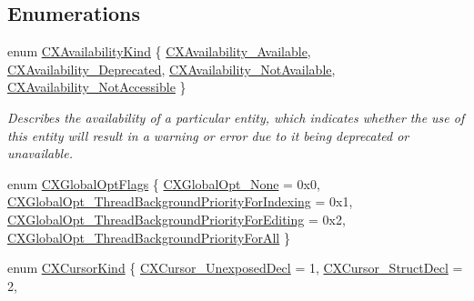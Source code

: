 \subsection*{Enumerations}
\begin{DoxyCompactItemize}
\item 
enum \mbox{\hyperlink{group__CINDEX_gada331ea0195e952c8f181ecf15e83d71}{C\+X\+Availability\+Kind}} \{ \mbox{\hyperlink{group__CINDEX_ggada331ea0195e952c8f181ecf15e83d71a6e2a9a033b06aa1ac8ab0b8ad49f8467}{C\+X\+Availability\+\_\+\+Available}}, 
\mbox{\hyperlink{group__CINDEX_ggada331ea0195e952c8f181ecf15e83d71a8295a994c76ec17e391050da7334e8fc}{C\+X\+Availability\+\_\+\+Deprecated}}, 
\mbox{\hyperlink{group__CINDEX_ggada331ea0195e952c8f181ecf15e83d71af70fbd074c138cdf81b0286d202b0fa6}{C\+X\+Availability\+\_\+\+Not\+Available}}, 
\mbox{\hyperlink{group__CINDEX_ggada331ea0195e952c8f181ecf15e83d71af6542f250a1d21e256cd543669a49435}{C\+X\+Availability\+\_\+\+Not\+Accessible}}
 \}
\begin{DoxyCompactList}\small\item\em Describes the availability of a particular entity, which indicates whether the use of this entity will result in a warning or error due to it being deprecated or unavailable. \end{DoxyCompactList}\item 
enum \mbox{\hyperlink{group__CINDEX_ga1b451634928d6bcc961bf72a40e4d035}{C\+X\+Global\+Opt\+Flags}} \{ \mbox{\hyperlink{group__CINDEX_gga1b451634928d6bcc961bf72a40e4d035a869efb651da9e6d3da10a0fb43941d0d}{C\+X\+Global\+Opt\+\_\+\+None}} = 0x0, 
\mbox{\hyperlink{group__CINDEX_gga1b451634928d6bcc961bf72a40e4d035aba7b16ae973f035cd4156eeae579e47a}{C\+X\+Global\+Opt\+\_\+\+Thread\+Background\+Priority\+For\+Indexing}} = 0x1, 
\mbox{\hyperlink{group__CINDEX_gga1b451634928d6bcc961bf72a40e4d035a0da291ff18cccf9fcce2e75d46337a63}{C\+X\+Global\+Opt\+\_\+\+Thread\+Background\+Priority\+For\+Editing}} = 0x2, 
\mbox{\hyperlink{group__CINDEX_gga1b451634928d6bcc961bf72a40e4d035ad38031ffee9be191b92869bdf0fe82e2}{C\+X\+Global\+Opt\+\_\+\+Thread\+Background\+Priority\+For\+All}}
 \}
\item 
enum \mbox{\hyperlink{group__CINDEX_gaaccc432245b4cd9f2d470913f9ef0013}{C\+X\+Cursor\+Kind}} \{ \newline
\mbox{\hyperlink{group__CINDEX_ggaaccc432245b4cd9f2d470913f9ef0013ab6c248d25235d6188a1c56ecba85efaf}{C\+X\+Cursor\+\_\+\+Unexposed\+Decl}} = 1, 
\mbox{\hyperlink{group__CINDEX_ggaaccc432245b4cd9f2d470913f9ef0013abcdfdbef4602f6b4f23cf05909949a8e}{C\+X\+Cursor\+\_\+\+Struct\+Decl}} = 2, 

\end{DoxyCompactItemize}
